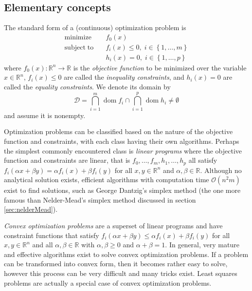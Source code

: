\subsection{Elementary concepts}
The standard form of a (continuous) optimization problem is
\begin{align} \label{eq:op}
\mathrm{minimize}   \quad & f_0(x) \nonumber \\
\mathrm{subject\;to} \quad &
f_i(x) \leq 0, \; i \in \left\{1, \dots, m \right\}\\
& h_i(x) = 0, \; i \in \left\{1, \dots, p \right\} \nonumber
\end{align}
where $f_0(x): \mathbb{R}^n \rightarrow \mathbb{R}$ is the \emph{objective function} to be minimized over the variable $x \in \mathbb{R}^n$, $f_i(x) \leq 0$ are called the \emph{inequality constraints}, and $h_i(x) = 0$ are called the \emph{equality constraints}. We denote its domain by
\begin{equation}
\mathcal{D} = \bigcap_{i=1}^m \operatorname{dom} f_i \cap \bigcap_{i=1}^p \operatorname{dom} h_i \neq \emptyset
\end{equation}
and assume it is nonempty.

Optimization problems can be classified based on the nature of the objective function and constraints, with each class having their own algorithms. Perhaps the simplest commonly encountered class is \emph{linear programs} where the objective function and constraints are linear, that is $f_0, \dots, f_m, h_1, \dots, h_p$ all satisfy $f_i(\alpha x + \beta y) = \alpha f_i(x) + \beta f_i(y)$ for all $x,y \in \mathbb{R}^n$ and $\alpha, \beta \in \mathbb{R}$. Although no analytical solution exists, efficient algorithms with computation time $\mathcal{O}(n^2m)$ exist to find solutions, such as George Dantzig's simplex method (the one more famous than Nelder-Mead's simplex method discussed in section \ref{sec:nelderMead}).

\emph{Convex optimization problems} are a superset of linear programs and have constraint functions that satisfy $f_i(\alpha x + \beta y) \le \alpha f_i(x) + \beta f_i(y)$ for all $x,y \in \mathbb{R}^n$ and all $\alpha, \beta \in \mathbb{R}$ with $\alpha, \beta \ge 0$ and $\alpha + \beta = 1$. In general, very mature and effective algorithms exist to solve convex optimization problems. If a problem can be transformed into convex form, then it becomes rather easy to solve, however this process can be very difficult and many tricks exist. Least squares problems are actually a special case of convex optimization problems.

